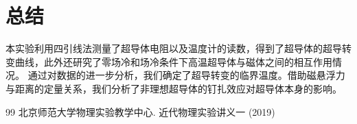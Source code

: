 \documentclass[a4paper, 1.5lines]{ctexart}
\begin{document}
    \section{总结}
        本实验利用四引线法测量了超导体电阻以及温度计的读数，得到了超导体的超导转变曲线，此外还研究了零场冷和场冷条件下高温超导体与磁体之间的相互作用情况。
        通过对数据的进一步分析，我们确定了超导转变的临界温度。借助磁悬浮力与距离的定量关系，我们分析了非理想超导体的钉扎效应对超导体本身的影响。
    \begin{thebibliography}{99}
        北京师范大学物理实验教学中心. 近代物理实验讲义一 (2019)
    \end{thebibliography}

    
\end{document}
